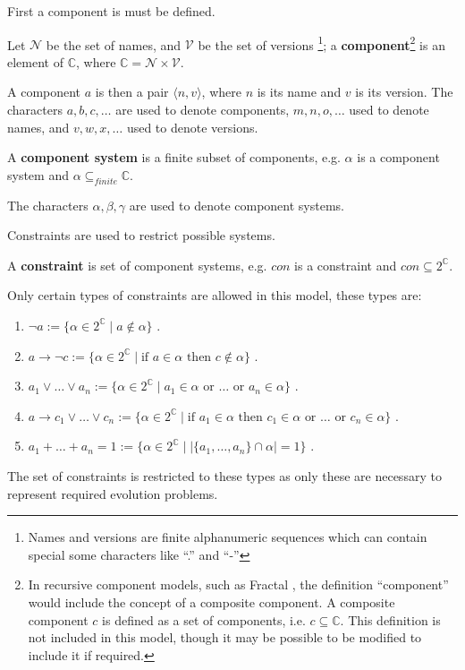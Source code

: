 First a component is must be defined.
\begin{defs}
\label{formal.componentdef}
Let $\mathcal{N}$ be the set of names, and $\mathcal{V}$ be the set of versions \footnote{Names and versions are finite alphanumeric sequences which can contain special some characters like ``.'' and ``-''}; 
a \textbf{component}\footnote{In recursive component models, such as Fractal \citep{Quma2006}, the definition ``component'' would include the concept of a composite component.
A composite component $c$ is defined as a set of components, i.e. $c \subseteq \mathbb{C}$.
This definition is not included in this model, though it may be possible to be modified to include it if required.} 
is an element of $\mathbb{C}$, where $\mathbb{C} = \mathcal{N} \times \mathcal{V}$. 
\end{defs}
A component $a$ is then a pair $\langle n,v \rangle$, where $n$ is its name and $v$ is its version.
The characters  $a,b,c,\ldots$ are used to denote components, $m,n,o,\ldots$ used to denote names, and $v,w,x,\ldots$ used to denote versions.

\begin{defs}
\label{formal.componentsystemdef}
A \textbf{component system} is a finite subset of components, e.g. $\alpha$ is a component system and $\alpha \subseteq_{finite} \mathbb{C}$. 
\end{defs}
The characters $\alpha,\beta,\gamma$ are used to denote component systems.

Constraints are used to restrict possible systems.
\begin{defs}
\label{formal.constraintdefs}
A \textbf{constraint} is set of component systems, e.g. $con$ is a constraint and $con \subseteq 2^{\mathbb{C}}$.
\end{defs}

Only certain types of constraints are allowed in this model, these types are:
\begin{enumerate}
  \item $\neg a := \{\alpha \in 2^{\mathbb{C}} \mid a \not \in \alpha \}$ \label{formal.removeconstraint}.
  \item $a \rightarrow \neg c := \{\alpha \in 2^{\mathbb{C}} \mid \mbox{if } a \in \alpha \mbox{ then } c \not \in \alpha\}$ \label{formal.conflictconstraint}.
  \item $a_1 \vee \ldots \vee a_n := \{\alpha \in 2^{\mathbb{C}} \mid a_1 \in \alpha \mbox{ or }\ldots \mbox{ or } a_n \in \alpha\}$ \label{formal.keepconstraint}.
  \item $a \rightarrow c_1 \vee \ldots \vee c_n := \{\alpha \in 2^{\mathbb{C}} \mid \mbox{if } a_1 \in \alpha \mbox{ then }  c_1 \in \alpha \mbox{ or } \ldots \mbox{ or } c_n \in \alpha\}$ \label{formal.dependencyconstraint}.
  \item $a_1 + \ldots + a_n = 1 := \{\alpha \in 2^{\mathbb{C}} \mid |\{a_1,\ldots,a_n\} \cap \alpha| = 1\}$ \label{formal.upgradeconstraint}.
\end{enumerate}
The set of constraints is restricted to these types as only these are necessary to represent required evolution problems. 

